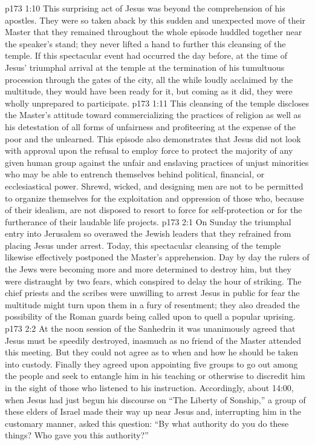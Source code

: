 \vs p173 1:10 This surprising act of Jesus was beyond the comprehension of his apostles. They were so taken aback by this sudden and unexpected move of their Master that they remained throughout the whole episode huddled together near the speaker’s stand; they never lifted a hand to further this cleansing of the temple. If this spectacular event had occurred the day before, at the time of Jesus’ triumphal arrival at the temple at the termination of his tumultuous procession through the gates of the city, all the while loudly acclaimed by the multitude, they would have been ready for it, but coming as it did, they were wholly unprepared to participate.
\vs p173 1:11 This cleansing of the temple discloses the Master’s attitude toward commercializing the practices of religion as well as his detestation of all forms of unfairness and profiteering at the expense of the poor and the unlearned. This episode also demonstrates that Jesus did not look with approval upon the refusal to employ force to protect the majority of any given human group against the unfair and enslaving practices of unjust minorities who may be able to entrench themselves behind political, financial, or ecclesiastical power. Shrewd, wicked, and designing men are not to be permitted to organize themselves for the exploitation and oppression of those who, because of their idealism, are not disposed to resort to force for self\hyp{}protection or for the furtherance of their laudable life projects.
\vs p173 2:1 On Sunday the triumphal entry into Jerusalem so overawed the Jewish leaders that they refrained from placing Jesus under arrest. Today, this spectacular cleansing of the temple likewise effectively postponed the Master’s apprehension. Day by day the rulers of the Jews were becoming more and more determined to destroy him, but they were distraught by two fears, which conspired to delay the hour of striking. The chief priests and the scribes were unwilling to arrest Jesus in public for fear the multitude might turn upon them in a fury of resentment; they also dreaded the possibility of the Roman guards being called upon to quell a popular uprising.
\vs p173 2:2 At the noon session of the Sanhedrin it was unanimously agreed that Jesus must be speedily destroyed, inasmuch as no friend of the Master attended this meeting. But they could not agree as to when and how he should be taken into custody. Finally they agreed upon appointing five groups to go out among the people and seek to entangle him in his teaching or otherwise to discredit him in the sight of those who listened to his instruction. Accordingly, about 14:00, when Jesus had just begun his discourse on “The Liberty of Sonship,” a group of these elders of Israel made their way up near Jesus and, interrupting him in the customary manner, asked this question: “By what authority do you do these things? Who gave you this authority?”
